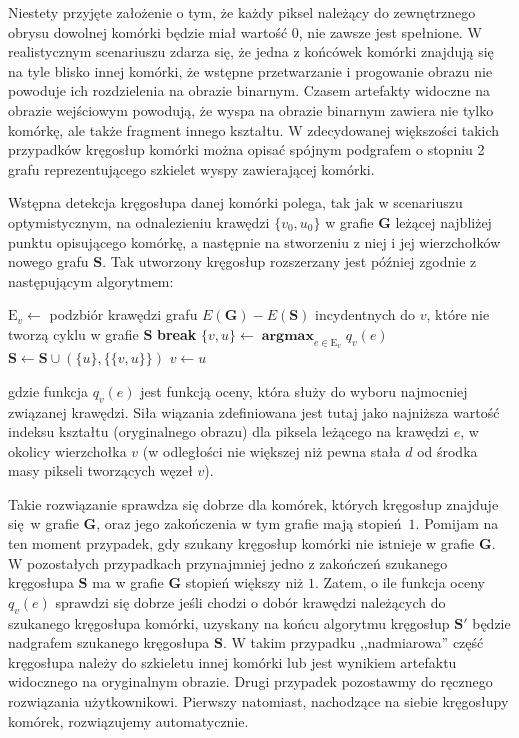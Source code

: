 \documentclass[declaration,shortabstract,mgr]{iithesis}
\DeclareMathOperator*{\argmax}{\textbf{argmax}}
\begin{document}
Niestety przyjęte założenie o tym, że każdy piksel należący do zewnętrznego obrysu dowolnej komórki będzie miał wartość $0$, nie zawsze jest spełnione. W realistycznym scenariuszu zdarza się, że jedna z końcówek komórki znajdują się na tyle blisko innej komórki, że wstępne przetwarzanie i progowanie obrazu nie powoduje ich rozdzielenia na obrazie binarnym. Czasem artefakty widoczne na obrazie wejściowym powodują, że wyspa na obrazie binarnym zawiera nie tylko komórkę, ale także fragment innego kształtu. W zdecydowanej większości takich przypadków kręgosłup komórki można opisać spójnym podgrafem o stopniu 2 grafu reprezentującego szkielet wyspy zawierającej komórki.

Wstępna detekcja kręgosłupa danej komórki polega, tak jak w scenariuszu optymistycznym, na odnalezieniu krawędzi $\{v_0, u_0\}$ w grafie $\mathbf{G}$ leżącej najbliżej punktu opisującego komórkę, a następnie na stworzeniu z niej i jej wierzchołków nowego grafu $\mathbf{S}$. Tak utworzony kręgosłup rozszerzany jest później zgodnie z następującym algorytmem:

\begin{algorithmic}

  \LOOP
    \STATE
      $\text{E}_v \gets$ podzbiór krawędzi grafu $E(\mathbf{G}) - E(\mathbf{S})$ incydentnych do $v$,\newline
       które nie tworzą cyklu w grafie $\mathbf{S}$
      \STATE \textbf{break}
    \ENDIF
    \STATE $\{v, u\} \gets \argmax_{e \in \text{E}_v} q_v(e)$
    \STATE $\mathbf{S} \gets \mathbf{S} \cup (\{u\}, \{\{v, u\}\}) $
    \STATE $v \gets u$
  \ENDLOOP
\ENDFOR
\end{algorithmic}
gdzie funkcja $q_v(e)$ jest funkcją oceny, która służy do wyboru najmocniej związanej krawędzi. Siła wiązania zdefiniowana jest tutaj jako najniższa wartość indeksu kształtu (oryginalnego obrazu) dla piksela leżącego na krawędzi $e$, w okolicy wierzchołka $v$ (w odległości nie większej niż pewna stała $d$ od środka masy pikseli tworzących węzeł $v$).

Takie rozwiązanie sprawdza się dobrze dla komórek, których kręgosłup znajduje się w grafie $\mathbf{G}$, oraz jego zakończenia w tym grafie mają stopień $1$. Pomijam na ten moment przypadek, gdy szukany kręgosłup komórki nie istnieje w grafie $\mathbf{G}$. W pozostałych przypadkach przynajmniej jedno z zakończeń szukanego kręgosłupa $\mathbf{S}$ ma w grafie $\mathbf{G}$ stopień większy niż $1$. Zatem, o ile funkcja oceny $q_v(e)$ sprawdzi się dobrze jeśli chodzi o dobór krawędzi należących do szukanego kręgosłupa komórki, uzyskany na końcu algorytmu kręgosłup $\mathbf{S}'$ będzie nadgrafem szukanego kręgosłupa $\mathbf{S}$. W takim przypadku ,,nadmiarowa'' część kręgosłupa należy do szkieletu innej komórki lub jest wynikiem artefaktu widocznego na oryginalnym obrazie. Drugi przypadek pozostawmy do ręcznego rozwiązania użytkownikowi. Pierwszy natomiast, nachodzące na siebie kręgosłupy komórek, rozwiązujemy automatycznie.
\end{document}
